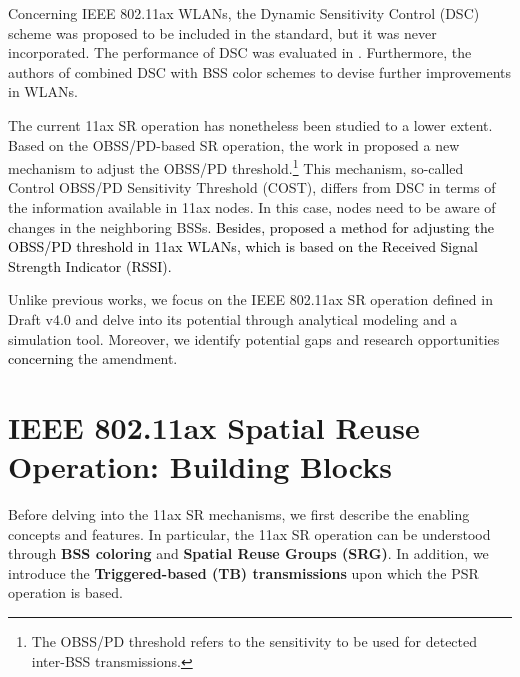 \documentclass{ieeeaccess}
\begin{document}
Concerning IEEE 802.11ax WLANs, the Dynamic Sensitivity Control (DSC) scheme was proposed to be included in the standard, but it was never incorporated. The performance of DSC was evaluated in \cite{afaqui2015evaluation, afaqui2016dynamic, kulkarni2015taming}. Furthermore, the authors of \cite{selinis2016evaluation, selinis2017exploiting} combined DSC with BSS color schemes to devise further improvements in WLANs.

The current 11ax SR operation has nonetheless been studied to a lower extent. Based on the OBSS/PD-based SR operation, the work in \cite{selinis2018control} proposed a new mechanism to adjust the OBSS/PD threshold.\footnote{The OBSS/PD threshold refers to the sensitivity to be used for detected inter-BSS transmissions.} This mechanism, so-called Control OBSS/PD Sensitivity Threshold (COST), differs from DSC in terms of the information available in 11ax nodes. In this case, nodes need to be aware of changes in the neighboring BSSs. \textcolor{black}{Besides, \cite{ropitault2018evaluation} proposed a method for adjusting the OBSS/PD threshold in 11ax WLANs, which is based on the Received Signal Strength Indicator (RSSI).}

Unlike previous works, we focus on the IEEE 802.11ax SR operation defined in Draft v4.0 and delve into its potential through analytical modeling and a simulation tool. Moreover, we identify potential gaps and research opportunities \textcolor{black}{concerning} the amendment.

\section{IEEE 802.11ax Spatial Reuse Operation: Building Blocks}
\label{section:enablers_sr_11ax}
Before delving into the 11ax SR mechanisms, we first describe the enabling concepts and features. In particular, the 11ax SR operation can be understood through \textbf{BSS coloring} and \textbf{Spatial Reuse Groups (SRG)}. In addition, we introduce the \textbf{Triggered-based (TB) transmissions} upon which the PSR operation is based.

\end{document}
